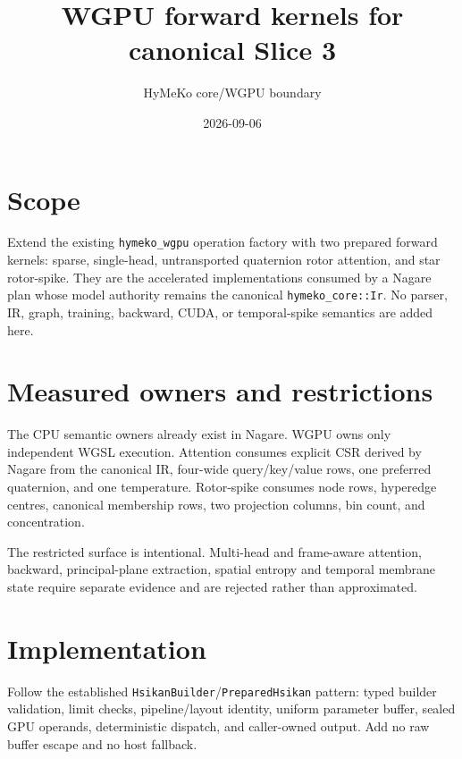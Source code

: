 \documentclass[10pt,a4paper]{article}
\title{WGPU forward kernels for canonical Slice 3}
\author{HyMeKo core/WGPU boundary}
\date{2026-09-06}
\begin{document}
\maketitle
\section{Scope}
Extend the existing \texttt{hymeko\_wgpu} operation factory with two prepared
forward kernels: sparse, single-head, untransported quaternion rotor attention,
and star rotor-spike.  They are the accelerated implementations consumed by a
Nagare plan whose model authority remains the canonical
\texttt{hymeko\_core::Ir}.  No parser, IR, graph, training, backward, CUDA, or
temporal-spike semantics are added here.

\section{Measured owners and restrictions}
The CPU semantic owners already exist in Nagare.  WGPU owns only independent
WGSL execution.  Attention consumes explicit CSR derived by Nagare from the
canonical IR, four-wide query/key/value rows, one preferred quaternion, and one
temperature.  Rotor-spike consumes node rows, hyperedge centres, canonical
membership rows, two projection columns, bin count, and concentration.

The restricted surface is intentional.  Multi-head and frame-aware attention,
backward, principal-plane extraction, spatial entropy and temporal membrane
state require separate evidence and are rejected rather than approximated.

\section{Implementation}
Follow the established \texttt{HsikanBuilder}/\texttt{PreparedHsikan} pattern:
typed builder validation, limit checks, pipeline/layout identity, uniform
parameter buffer, sealed GPU operands, deterministic dispatch, and caller-owned
output.  Add no raw buffer escape and no host fallback.
\end{document}
